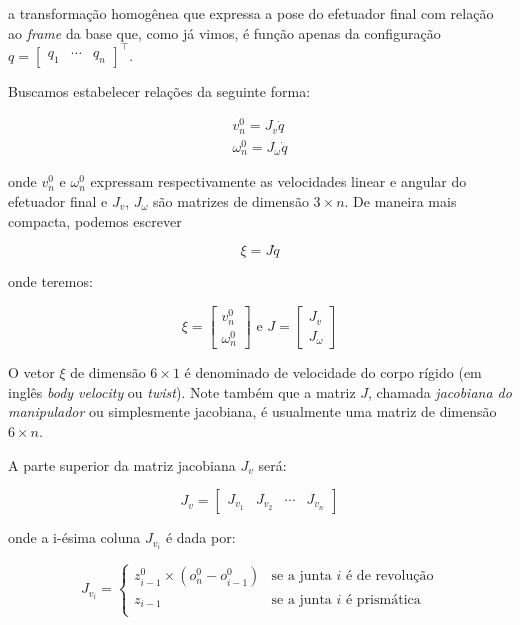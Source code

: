 a transformação homogênea que expressa a pose do efetuador final com relação ao
\emph{frame} da base que, como já vimos, é função apenas da configuração \(q =
\begin{bmatrix}
    q_1 & \cdots & q_n
\end{bmatrix}^\top\).

Buscamos estabelecer relações da seguinte forma:

\begin{align}
    v_n^0 = J_v \dot{q} \\
    \omega_n^0 = J_\omega \dot{q}
\end{align}

onde \(v_n^0\) e \(\omega_n^0\) expressam respectivamente as velocidades linear
e angular do efetuador final e \(J_v\), \(J_\omega\) são matrizes de dimensão
\(3 \times n\). De maneira mais compacta, podemos escrever

\begin{equation}
    \xi = J \dot{q}
\end{equation}

onde teremos:

\begin{equation}
    \xi = \begin{bmatrix}
        v_n^0 \\
        \omega_n^0
    \end{bmatrix} \text{ e } J = \begin{bmatrix}
        J_v \\
        J_\omega
    \end{bmatrix}
\end{equation}

O vetor \(\xi\) de dimensão \(6 \times 1\) é denominado de velocidade do corpo
rígido (em inglês \emph{body velocity} ou \emph{twist}). Note também que a
matriz \(J\), chamada \emph{jacobiana do manipulador} ou simplesmente
jacobiana, é usualmente uma matriz de dimensão \(6 \times n\).

A parte superior da matriz jacobiana \(J_v\) será:

\begin{equation}
    J_v = \begin{bmatrix}
        J_{v_1} & J_{v_2} & \cdots & J_{v_n}
    \end{bmatrix}
\end{equation}

onde a i-ésima coluna \(J_{v_i}\) é dada por:

\begin{equation}
    J_{v_i} =
    \begin{cases}
        z_{i-1}^0 \times (o_n^0 - o_{i-1}^0) & \text{se a junta $i$ é de revolução} \\
        z_{i-1}                              & \text{se a junta $i$ é prismática}   \\
    \end{cases}
\end{equation}

